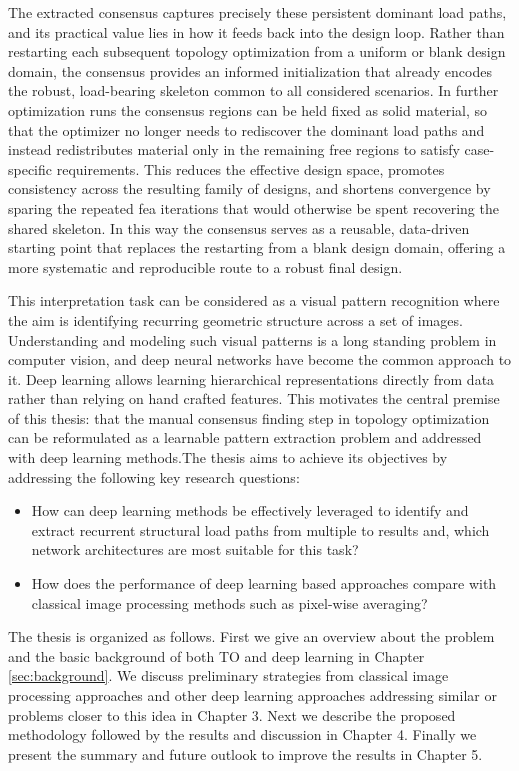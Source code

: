 \documentclass[
  numbers=noenddot,
  english,  %
  a4paper,  %
  twoside,  %
  bibliography=totoc,
  headsepline,
  cleardoublepage=empty,
  parskip=half,
  draft=false
]{scrbook}
\theoremstyle{break}
\begin{document}
The extracted consensus captures precisely these persistent dominant load paths, and its practical value lies in how it feeds back into the design loop. Rather than restarting each subsequent topology optimization from a uniform or blank design domain, the consensus provides an informed initialization that already encodes the robust, load-bearing skeleton common to all considered scenarios. In further optimization runs the consensus regions can be held fixed as solid material, so that the optimizer no longer needs to rediscover the dominant load paths and instead redistributes material only in the remaining free regions to satisfy case-specific requirements. This reduces the effective design space, promotes consistency across the resulting family of designs, and shortens convergence by sparing the repeated \gls{fea} iterations that would otherwise be spent
recovering the shared skeleton. In this way the consensus serves as a reusable, data-driven starting point that replaces the restarting from a blank design domain, offering a more systematic and reproducible route to a robust final design.

This interpretation task can be considered as a visual pattern recognition where the aim is identifying recurring geometric structure across a set of images. Understanding and modeling such visual patterns is a long standing problem in computer vision, and deep neural networks have become the common approach to it. Deep learning allows learning hierarchical representations directly from data rather than relying on hand crafted features. This motivates the central premise of this thesis: that the manual consensus finding step in topology optimization can be reformulated as a learnable pattern extraction problem and addressed with deep learning methods.The thesis aims to achieve its objectives by addressing the following key research questions:
\begin{itemize}
\item How can deep learning methods be effectively leveraged to identify and extract recurrent structural load paths from multiple \gls{to} results and, which network architectures are most suitable for this task?
\item How does the performance of deep learning based approaches compare with classical image processing methods such as pixel-wise averaging?
\end{itemize}

The thesis is organized as follows. First we give an overview about the problem and the basic background of both TO and deep learning in Chapter \ref{sec:background}. We discuss preliminary strategies from classical image processing approaches and other deep learning approaches addressing similar or problems closer to this idea in Chapter 3. Next we describe the proposed methodology  followed by the results and discussion in Chapter 4. Finally we present the summary and future outlook to improve the results in Chapter 5.
\end{document}
